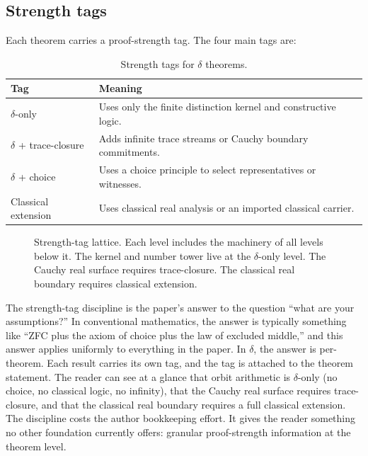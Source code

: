 \documentclass[11pt,a4paper]{article}
\theoremstyle{definition}
\theoremstyle{remark}
\begin{document}
\subsection{Strength tags}

Each theorem carries a proof-strength tag. The four main tags are:

\begin{table}[ht]
\centering
\begin{tabular}{ll}
\toprule
\textbf{Tag} & \textbf{Meaning} \\
\midrule
$\delta$-only &
  Uses only the finite distinction kernel and constructive logic. \\
$\delta$ + trace-closure &
  Adds infinite trace streams or Cauchy boundary commitments. \\
$\delta$ + choice &
  Uses a choice principle to select representatives or witnesses. \\
Classical extension &
  Uses classical real analysis or an imported classical carrier. \\
\bottomrule
\end{tabular}
\caption{Strength tags for $\delta$ theorems.}
\label{tab:strength}
\end{table}

\begin{figure}[ht]
\centering
{}
\caption{Strength-tag lattice. Each level includes the machinery of all
levels below it. The kernel and number tower live at the $\delta$-only level.
The Cauchy real surface requires trace-closure. The classical real boundary
requires classical extension.}
\label{fig:strength}
\end{figure}

The strength-tag discipline is the paper's answer to the question ``what are
your assumptions?'' In conventional mathematics, the answer is typically
something like ``ZFC plus the axiom of choice plus the law of excluded
middle,'' and this answer applies uniformly to everything in the paper. In
$\delta$, the answer is per-theorem. Each result carries its own tag, and
the tag is attached to the theorem statement. The reader can see at a glance that orbit
arithmetic is $\delta$-only (no choice, no classical logic, no infinity), that
the Cauchy real surface requires trace-closure, and that the classical real
boundary requires a full classical extension. The discipline costs the author
bookkeeping effort. It gives the reader something no other foundation
currently offers: granular proof-strength information at the theorem level.
\end{document}
